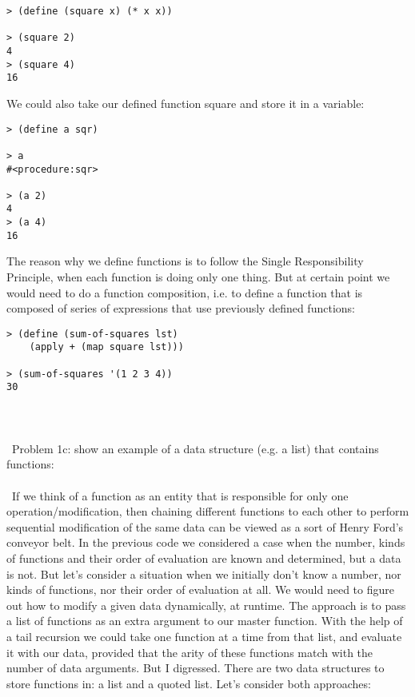 \documentclass{article}
\begin{document}
\begin{verbatim} 
> (define (square x) (* x x))

> (square 2)
4
> (square 4)
16
\end{verbatim}

We could also take our defined function square and store it in a variable:

\begin{verbatim} 
> (define a sqr)

> a
#<procedure:sqr>

> (a 2)
4
> (a 4)
16
\end{verbatim}

The reason why we define functions is to follow the Single Responsibility Principle, when each function is doing only one thing. But at certain point we would need to do a function composition, i.e. to define a function that is composed of series of expressions that use previously defined functions:

\begin{verbatim} 
> (define (sum-of-squares lst)
    (apply + (map square lst)))
    
> (sum-of-squares '(1 2 3 4))
30
\end{verbatim}

\paragraph{}\
\paragraph{}\
Problem 1c: show an example of a data structure (e.g. a list) that contains functions:
\paragraph{}\
If we think of a function as an entity that is responsible for only one operation/modification, then chaining different functions to each other to perform sequential modification of the same data can be viewed as a sort of Henry Ford's conveyor belt. In the previous code we considered a case when the number, kinds of functions and their order of evaluation are known and determined, but a data is not. But let's consider a situation when we initially don't know a number, nor kinds of functions, nor their order of evaluation at all. We would need to figure out how to modify a given data dynamically, at runtime. The approach is to pass a list of functions as an extra argument to our master function. With the help of a tail recursion we could take one function at a time from that list, and evaluate it with our data, provided that the arity of these functions match with the number of data arguments. But I digressed. There are two data structures to store functions in: a list and a quoted list. Let's consider both approaches:
\end{document}
